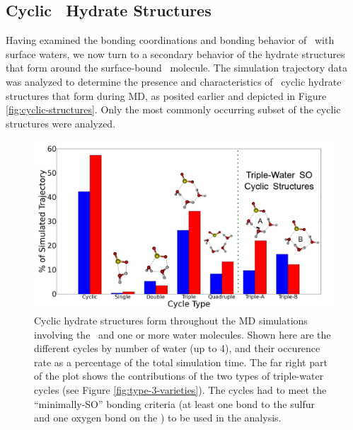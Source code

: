 \subsection{Cyclic \suldiox~Hydrate Structures}

Having examined the bonding coordinations and bonding behavior of \suldiox~with surface waters, we now turn to a secondary behavior of the hydrate structures that form around the surface-bound \suldiox~molecule. The simulation trajectory data was analyzed to determine the presence and characteristics of \suldiox~cyclic hydrate structures that form during MD, as posited earlier and depicted in Figure \ref{fig:cyclic-structures}. Only the most commonly occurring subset of the cyclic structures were analyzed. 

\begin{figure}[h!]
	\begin{center}
		\includegraphics[scale=1.0]{images/cycles/SO-cycle-breakdown-with-cartoons-small.png}
		\caption{Cyclic hydrate structures form throughout the MD simulations involving the \suldiox~and one or more water molecules. Shown here are the different cycles by number of water (up to 4), and their occurence rate as a percentage of the total simulation time. The far right part of the plot shows the contributions of the two types of triple-water cycles (see Figure \ref{fig:type-3-varieties}). The cycles had to meet the ``minimally-SO'' bonding criteria (at least one bond to the sulfur and one oxygen bond on the \suldiox) to be used in the analysis.}
		\label{fig:cyclic-breakdown}
	\end{center}
\end{figure}

